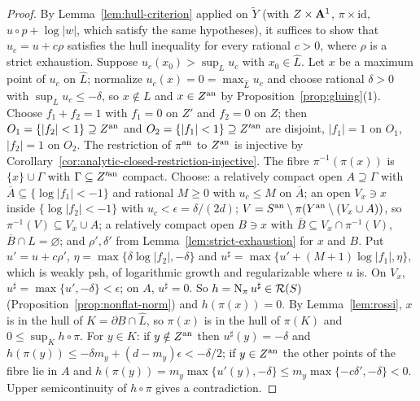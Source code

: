 \begin{proof}
By Lemma~\ref{lem:hull-criterion} applied on $\widetilde Y$ (with $Z\times\mathbf{A}^1$, $\pi\times\mathrm{id}$,
$u\circ p+\log|w|$, which satisfy the same hypotheses), it suffices to show that $u_c=u+c\rho$
satisfies the hull inequality for every rational $c>0$, where $\rho$ is a strict exhaustion. Suppose
$u_c(x_0)>\sup_Lu_c$ with $x_0\in\widehat L$. Let $x$ be a maximum point of $u_c$ on $\widehat L$;
normalize $u_c(x)=0=\max_{\widehat L}u_c$ and choose rational $\delta>0$ with $\sup_Lu_c\le-\delta$, so
$x\notin L$ and $x\in Z^{\mathrm{an}}$ by Proposition~\ref{prop:gluing}(1). Choose $f_1+f_2=1$ with $f_1=0$ on
$Z'$ and $f_2=0$ on $Z$; then $O_1=\{|f_2|<1\}\supseteq Z^{\mathrm{an}}$ and $O_2=\{|f_1|<1\}\supseteq Z'^{\mathrm{an}}$ are
disjoint, $|f_1|=1$ on $O_1$, $|f_2|=1$ on $O_2$. The restriction of $\pi^{\mathrm{an}}$ to $Z^{\mathrm{an}}$
is injective by Corollary~\ref{cor:analytic-closed-restriction-injective}.
The fibre $\pi^{-1}(\pi(x))$ is $\{x\}\cup\Gamma$ with
$\Gamma\subseteq Z'^{\mathrm{an}}$ compact. Choose: a relatively compact open $A\supseteq\Gamma$ with
$\overline A\subseteq\{\log|f_1|<-1\}$ and rational $M\ge0$ with $u_c\le M$ on $\overline A$; an open
$V_x\ni x$ inside $\{\log|f_2|<-1\}$ with $u_c<\epsilon=\delta/(2d)$; $V=S^{\mathrm{an}}\setminus
\pi(Y^{\mathrm{an}}\setminus(V_x\cup A))$, so $\pi^{-1}(V)\subseteq V_x\cup A$; a relatively compact open
$B\ni x$ with $\overline B\subseteq V_x\cap\pi^{-1}(V)$, $\overline B\cap L=\varnothing$; and
$\rho',\delta'$ from Lemma~\ref{lem:strict-exhaustion} for $x$ and $B$. Put $u'=u+c\rho'$,
$\eta=\max\{\delta\log|f_2|,-\delta\}$ and $u^\sharp=\max\{u'+(M+1)\log|f_1|,\eta\}$, which is weakly psh,
of logarithmic growth and regularizable where $u$ is. On $V_x$, $u^\sharp=\max\{u',-\delta\}<\epsilon$;
on $A$, $u^\sharp=0$. So $h=\operatorname{N}_\pi u^\sharp\in\mathcal{R}(S)$ (Proposition~\ref{prop:nonflat-norm}) and
$h(\pi(x))=0$. By Lemma~\ref{lem:rossi}, $x$ is in the hull of $K=\partial B\cap\widehat L$, so $\pi(x)$ is
in the hull of $\pi(K)$ and $0\le\sup_Kh\circ\pi$. For $y\in K$: if $y\notin Z^{\mathrm{an}}$ then
$u^\sharp(y)=-\delta$ and $h(\pi(y))\le-\delta m_y+(d-m_y)\epsilon<-\delta/2$; if $y\in Z^{\mathrm{an}}$ the other
points of the fibre lie in $A$ and $h(\pi(y))=m_y\max\{u'(y),-\delta\}\le m_y\max\{-c\delta',-\delta\}<0$.
Upper semicontinuity of $h\circ\pi$ gives a contradiction.
\end{proof}

